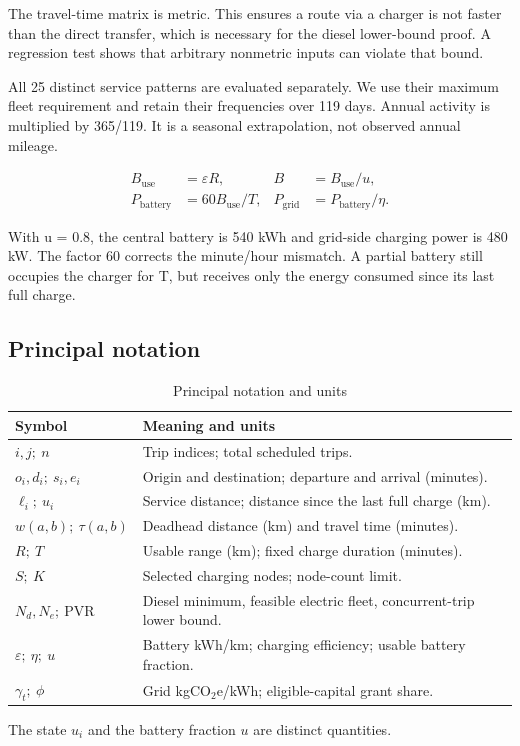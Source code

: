 The travel-time matrix is metric. This ensures a route via a charger is not faster than the direct transfer, which is necessary for the diesel lower-bound proof. A regression test shows that arbitrary nonmetric inputs can violate that bound.


All 25 distinct service patterns are evaluated separately. We use their maximum fleet requirement and retain their frequencies over 119 days. Annual activity is multiplied by 365/119. It is a seasonal extrapolation, not observed annual mileage.


\begin{align}
B_{\mathrm{use}}&=\varepsilon R, & B&=B_{\mathrm{use}}/u,\\
P_{\mathrm{battery}}&=60B_{\mathrm{use}}/T, &
P_{\mathrm{grid}}&=P_{\mathrm{battery}}/\eta .
\end{align}

With u = 0.8, the central battery is 540 kWh and grid-side charging power is 480 kW. The factor 60 corrects the minute/hour mismatch. A partial battery still occupies the charger for T, but receives only the energy consumed since its last full charge.


\subsection*{Principal notation}
\begin{longtable}{@{}L{0.22\textwidth}L{0.70\textwidth}@{}}
\caption{Principal notation and units}\label{tab:notation}\\
\toprule Symbol & Meaning and units\\\midrule
$i,j;\ n$ & Trip indices; total scheduled trips.\\
$o_i,d_i;\ s_i,e_i$ & Origin and destination; departure and arrival (minutes).\\
$\ell_i;\ u_i$ & Service distance; distance since the last full charge (km).\\
$w(a,b);\ \tau(a,b)$ & Deadhead distance (km) and travel time (minutes).\\
$R;\ T$ & Usable range (km); fixed charge duration (minutes).\\
$S;\ K$ & Selected charging nodes; node-count limit.\\
$N_d,N_e;\ \mathrm{PVR}$ & Diesel minimum, feasible electric fleet, concurrent-trip lower bound.\\
$\varepsilon;\ \eta;\ u$ & Battery kWh/km; charging efficiency; usable battery fraction.\\
$\gamma_t;\ \phi$ & Grid kgCO$_2$e/kWh; eligible-capital grant share.\\
\bottomrule
\end{longtable}
The state $u_i$ and the battery fraction $u$ are distinct quantities.

